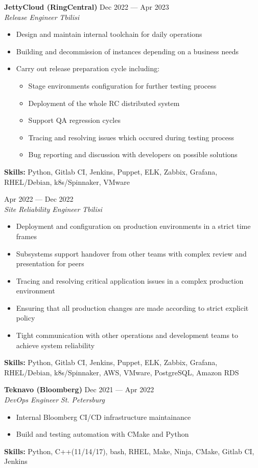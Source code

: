 \documentclass[10pt]{report}
\newenvironment{JobDescription}[5]{
    \vspace{ #5 }
    \flushleft
    {\bf #1 } \hfill { #2 }
    \\
    {\em #3 } \hfill {\em #4 }
    \begin{itemize}
} {
    \end{itemize}
}
\begin{document}
\goodbreak

\begin{JobDescription}{JettyCloud (RingCentral)}{Dec 2022 --- Apr 2023}{Release Engineer}{Tbilisi}{2mm}
    \item Design and maintain internal toolchain for daily operations
    \item Building and decommission of instances depending on a business needs
    \item Carry out release preparation cycle including:
    \begin{itemize}
        \item Stage environments configuration for further testing process
        \item Deployment of the whole RC distributed system
        \item Support QA regression cycles
        \item Tracing and resolving issues which occured during testing process
        \item Bug reporting and discussion with developers on possible solutions
    \end{itemize}
\end{JobDescription}
{\bf Skills:} Python, Gitlab CI, Jenkins, Puppet, ELK, Zabbix, Grafana, RHEL/Debian, k8s/Spinnaker, VMware
\vspace{3mm}

\begin{JobDescription}{}{Apr 2022 --- Dec 2022}{Site Reliability Engineer}{Tbilisi}{-3mm}
    \item Deployment and configuration on production environments in a strict time frames
    \item Subsystems support handover from other teams with complex review and
          presentation for peers
    \item Tracing and resolving critical application issues in a complex
          production environment
    \item Ensuring that all production changes are made according to strict
          explicit policy
    \item Tight communication with other operations and development teams
          to achieve system reliability
\end{JobDescription}
{\bf Skills:} Python, Gitlab CI, Jenkins, Puppet, ELK, Zabbix, Grafana, RHEL/Debian, k8s/Spinnaker, AWS, VMware,
PostgreSQL, Amazon RDS

\begin{JobDescription}{Teknavo (Bloomberg)}{Dec 2021 --- Apr 2022}{DevOps Engineer}{St. Petersburg}{5mm}
    \item Internal Bloomberg CI/CD infrastructure maintainance
    \item Build and testing automation with CMake and Python
\end{JobDescription}
{\bf Skills:} Python, C++(11/14/17), bash, RHEL, Make, Ninja, CMake, Gitlab CI, Jenkins
\vspace{3mm}
\end{document}

